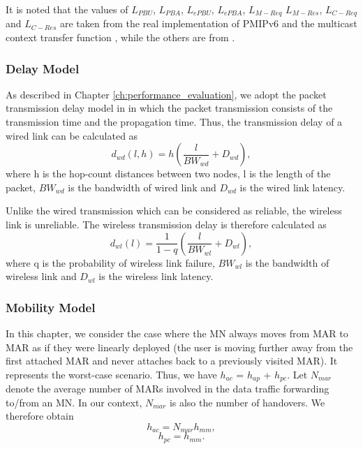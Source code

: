 It is noted that the values of $L_{PBU}$,  $L_{PBA}$, $L_{ePBU}$, $L_{ePBA}$, $L_{M-Req}$ $L_{M-Res}$, $L_{C-Req}$ and $L_{C-Res}$ are taken from the real implementation of PMIPv6 \cite{oai_pmip} and the multicast context transfer function \cite{d4.4}, while the others are from \cite{HO_comparison_Lee,DMM_analysis_Hassan}.  

\subsubsection{Delay Model}
As described in Chapter \ref{ch:performance_evaluation}, we adopt the packet transmission delay model in \cite{packet_transmission_delay} in which the packet transmission consists of the transmission time and the propagation time.  
Thus, the transmission delay of a wired link can be calculated as\\
\begin{equation}
d_{wd}(l,h) = h (\dfrac{l}{BW_{wd}} + D_{wd}),
\end{equation}
where h is the hop-count distances between two nodes, l is the length of the packet, $BW_{wd}$ is the bandwidth of wired link and $D_{wd}$ is the wired link latency. 

Unlike the wired transmission which can be considered as reliable, the wireless link is unreliable. The wireless transmission delay is therefore calculated as \cite{packet_transmission_delay}\\
\begin{equation}
d_{wl}(l) = \dfrac{1}{1-q} (\dfrac{l}{BW_{wl}} + D_{wl}),
\end{equation} 
where q is the probability of wireless link failure, $BW_{wl}$ is the bandwidth of wireless link and $D_{wl}$ is the wireless link latency.  

\subsubsection{Mobility Model}
In this chapter, we consider the case where the MN always moves from MAR to MAR as if they were linearly deployed (the user is moving further away from the first attached MAR and never attaches back to a previously visited MAR). It represents the worst-case scenario. Thus, we have $h_{ac}$ = $h_{ap}$ + $h_{pc}$.
Let $N_{mar}$ denote the average number of MARs involved in the data traffic forwarding to/from an MN. In our context, $N_{mar}$ is also the number of handovers. We therefore obtain \\
\begin{equation}
h_{ac} = N_{mar} h_{mm},
\end{equation} 
\begin{equation}
h_{pc} = h_{mm}.
\end{equation}

